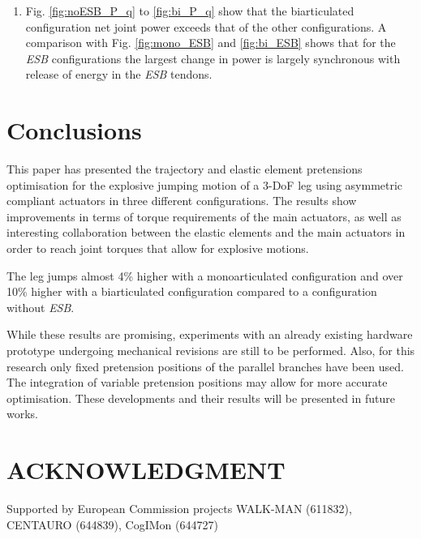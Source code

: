 \documentclass[letterpaper, 10 pt, conference]{ieeeconf}  %
\begin{document}
\begin{enumerate}
		\item Fig. \ref{fig:noESB_P_q} to \ref{fig:bi_P_q} show that the biarticulated configuration net joint power exceeds that of the other configurations. A comparison with Fig. \ref{fig:mono_ESB} and \ref{fig:bi_ESB} shows that for the \textit{ESB} configurations the largest change in power is largely synchronous with release of energy in the \textit{ESB} tendons.
		
	\end{enumerate}
	
	
	\section{Conclusions} \label{sec:conclusions} 
	This paper has presented the trajectory and elastic element pretensions optimisation for the explosive jumping motion of a 3-DoF leg using asymmetric compliant actuators in three different configurations. The results show improvements in terms of torque requirements of the main actuators, as well as interesting collaboration between the elastic elements and the main actuators in order to reach joint torques that allow for explosive motions.
	
	The leg jumps almost 4\% higher with a monoarticulated configuration and over 10\% higher with a biarticulated configuration compared to a configuration without \textit{ESB}.
	
	While these results are promising, experiments with an already existing hardware prototype undergoing mechanical revisions are still to be performed. Also, for this research only fixed pretension positions of the parallel branches have been used. The integration of variable pretension positions may allow for more accurate optimisation. These developments and their results will be presented in future works.
	
	
	\addtolength{\textheight}{-0cm}   %
	
	
	\section{ACKNOWLEDGMENT}
	Supported by European Commission projects WALK-MAN (611832), CENTAURO (644839), CogIMon (644727)
	
	
	
	
\end{document}
